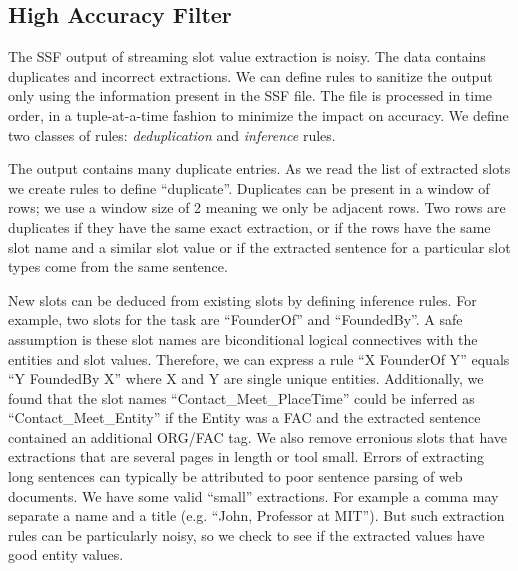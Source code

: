 \subsection{High Accuracy Filter}
\label{section:highAccuracyFilter}

The SSF output of streaming slot value extraction is noisy. The data contains duplicates and 
incorrect extractions. We can define rules to sanitize the output only using 
the information present in the SSF file. The file is processed in time order, 
in a tuple-at-a-time fashion to minimize the impact on accuracy. We define 
two classes of rules: \textit{deduplication} and \textit{inference} rules.

The output contains many duplicate entries. As we read the list of extracted 
slots we create rules to define ``duplicate''. Duplicates can be present in a 
window of rows; we use a window size of 2 meaning we only be adjacent rows. 
Two rows are duplicates if they have the same exact extraction, or if the 
rows have the same slot name and a similar slot value or if the extracted 
sentence for a particular slot types come from the same sentence.

 New slots can be deduced from existing slots by defining inference rules. 
 For example, two slots for the task are ``FounderOf'' and ``FoundedBy''. A safe 
 assumption is these slot names are biconditional logical connectives with the 
 entities and slot values. Therefore, we can express a rule ``X FounderOf Y'' 
 equals ``Y FoundedBy X'' where X and Y are single unique entities. Additionally,
 we found that the slot names ``Contact\_Meet\_PlaceTime'' could be inferred as
 ``Contact\_Meet\_Entity'' if the Entity was a FAC and the extracted sentence 
 contained an additional ORG/FAC tag.  
We also remove erronious slots that have extractions that are several pages in 
length or tool small. Errors of extracting long sentences can typically be 
attributed to poor sentence parsing of web documents. We have some valid
``small'' extractions. For example a comma may separate a name and a title
(e.g. ``John, Professor at MIT''). But such extraction rules can be particularly 
noisy, so we check to see if the extracted values have good entity values.




